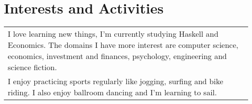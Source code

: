 \documentclass[a4paper,10pt]{article} %
\begin{document}

\section{Interests and Activities}
\begin{tabular}{p{11cm}}
I love learning new things, I'm currently studying Haskell and
Economics. The domains I have more interest are computer science, economics, investment and finances, psychology, engineering and science fiction.\\

I enjoy practicing sports regularly like jogging, surfing and bike riding.
I also enjoy ballroom dancing and I'm learning to sail.
\end{tabular}
\end{document}
